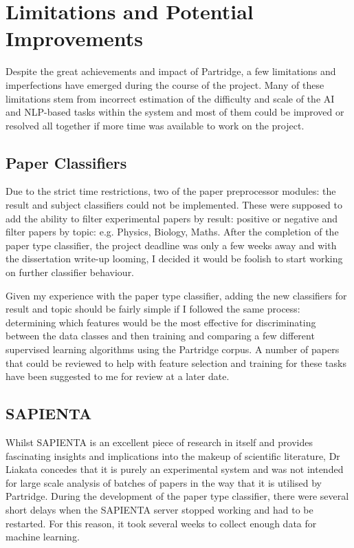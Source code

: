 \section{ Limitations and Potential Improvements }

Despite the great achievements and impact of Partridge, a few limitations and
imperfections have emerged during the course of the project. Many of these
limitations stem from incorrect estimation of the difficulty and scale
of the AI and NLP-based tasks within the system and most of them could be
improved or resolved all together if more time was available to work on the
project.

\subsection{ Paper Classifiers}

Due to the strict time restrictions, two of the paper preprocessor modules: the
result and subject classifiers could not be implemented. These were supposed to
add the ability to filter experimental papers by result: positive or negative
and filter papers by topic: e.g. Physics, Biology, Maths. After the completion
of the paper type classifier, the project deadline was only a few weeks away
and with the dissertation write-up looming, I decided it would be foolish to
start working on further classifier behaviour.

Given my experience with the paper type classifier, adding the new classifiers
for result and topic should be fairly simple if I followed the same process:
determining which features would be the most effective for discriminating
between the data classes and then training and comparing a few different
supervised learning algorithms using the Partridge corpus. A number of papers
that could be reviewed to help with feature selection and training for these
tasks have been suggested to me for review at a later date.

\subsection{ SAPIENTA }

Whilst SAPIENTA is an excellent piece of research in itself and provides
fascinating insights and implications into the makeup of scientific literature,
Dr Liakata concedes that it is purely an experimental system and was not
intended for large scale analysis of batches of papers in the way that it is
utilised by Partridge. During the development of the paper type classifier,
there were several short delays when the SAPIENTA server stopped working and
had to be restarted. For this reason, it took several weeks to collect enough data for machine
learning. 

